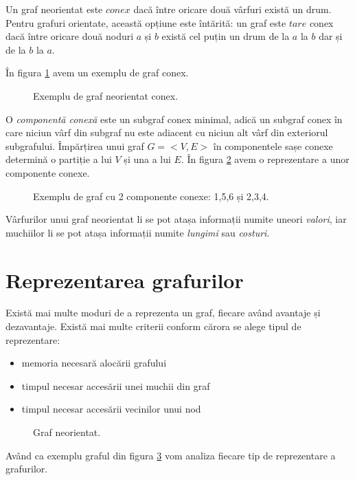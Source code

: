 Un graf neorientat este $conex$ dacă între oricare două vârfuri există un drum. Pentru grafuri orientate, această opțiune este întărită: un graf este $tare$ conex dacă între oricare două noduri $a$ și $b$ există cel puțin un drum de la $a$ la $b$ dar și de la $b$ la $a$.

În figura \ref{fig:conex} avem un exemplu de graf conex.

\begin{figure}[H] 
	\centering	
	{
	}
	\caption{Exemplu de graf neorientat conex.} 
	\label{fig:conex}
\end{figure}

O \textit{componentă conexă} este un subgraf conex minimal, adică un subgraf conex în care niciun vârf din subgraf nu este adiacent cu niciun alt vârf din exteriorul subgrafului.
Împărțirea unui graf $G=<V,E>$ în componentele sașe conexe determină o partiție a lui $V$ și una a lui $E$. În figura \ref{fig:conexcomp} avem o reprezentare a unor componente conexe.

\begin{figure}[H] 
	\centering	
	{
	}
	\caption{Exemplu de graf cu 2 componente conexe: {1,5,6} și {2,3,4}.} 
	\label{fig:conexcomp}
\end{figure}

Vârfurilor unui graf neorientat li se pot atașa informații numite uneori \textit{valori}, iar muchiilor li se pot atașa informații numite \textit{lungimi} sau \textit{costuri}.

\section{Reprezentarea grafurilor}

Există mai multe moduri de a reprezenta un graf, fiecare având avantaje și dezavantaje. Există mai multe criterii conform cărora se alege tipul de reprezentare:

\begin{itemize}
\item {memoria necesară alocării grafului}
\item {timpul necesar accesării unei muchii din graf}
\item {timpul necesar accesării vecinilor unui nod}
\end{itemize}



\begin{figure}[H] 
	\centering	
	{
	}
	\caption{Graf neorientat.} 
	\label{fig:reprezentare}
\end{figure}
Având ca exemplu graful din figura \ref{fig:reprezentare} vom analiza fiecare tip de reprezentare a grafurilor.

